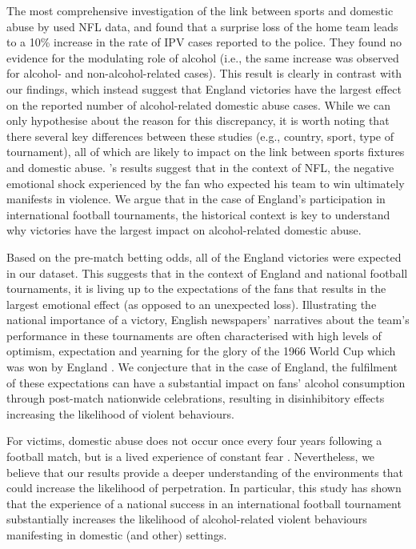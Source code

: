 \documentclass[12pt, a4paper]{article}
\begin{document}
The most comprehensive investigation of the link between sports and domestic abuse by  used NFL data, and found that a surprise loss of the home team leads to a 10\% increase in the rate of IPV cases reported to the police. They found no evidence for the modulating role of alcohol (i.e., the same increase was observed for alcohol- and non-alcohol-related cases). This result is clearly in contrast with our findings, which instead suggest that England victories have the largest effect on the reported number of alcohol-related domestic abuse cases.
While we can only hypothesise about the reason for this discrepancy, it is worth noting that there several key differences between these studies (e.g., country, sport, type of tournament), all of which are likely to impact on the link between sports fixtures and domestic abuse. \citeauthor{Card2011}'s results suggest that in the context of NFL, the negative emotional shock experienced by the fan who expected his team to win ultimately manifests in violence. We argue that in the case of England's participation in international football tournaments, the historical context is key to understand why victories have the largest impact on alcohol-related domestic abuse.


Based on the pre-match betting odds, all of the England victories were expected in our dataset. This suggests that in the context of England and national football tournaments, it is living up to the expectations of the fans that results in the largest emotional effect (as opposed to an unexpected loss). Illustrating the national importance of a victory, English newspapers' narratives about the team's performance in these tournaments are often characterised with high levels of optimism, expectation and yearning for the glory of the 1966 World Cup which was won by England \cite{Vincent2010}. We conjecture that in the case of England, the fulfilment of these expectations can have a substantial impact on fans' alcohol consumption through post-match nationwide celebrations, resulting in disinhibitory effects increasing the likelihood of violent behaviours. 

   


For victims, domestic abuse does not occur once every four years following a football match, but is a lived experience of constant fear \cite{Brooks-Hay2018}. Nevertheless, we believe that our results provide a deeper understanding of the environments that could increase the likelihood of perpetration. In particular, this study has shown that the experience of a national success in an international football tournament substantially increases the likelihood of alcohol-related violent behaviours manifesting in domestic (and other) settings. 
\end{document}
